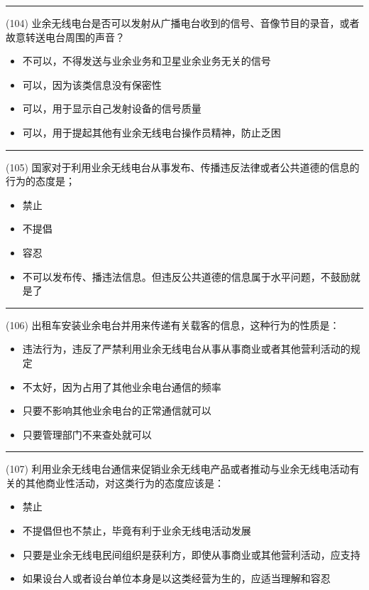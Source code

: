 \documentclass[twocolumn]{ctexart}  %
\begin{document}
\noindent\rule{0.5\textwidth}{1pt}
\heiti (104) 业余无线电台是否可以发射从广播电台收到的信号、音像节目的录音，或者故意转送电台周围的声音？ \songti {\color{gray} [LK0068] }
\begin{itemize}
	\item  不可以，不得发送与业余业务和卫星业余业务无关的信号
	\item  可以，因为该类信息没有保密性
	\item  可以，用于显示自己发射设备的信号质量
	\item  可以，用于提起其他有业余无线电台操作员精神，防止乏困
\end{itemize}


\noindent\rule{0.5\textwidth}{1pt}
\heiti (105) 国家对于利用业余无线电台从事发布、传播违反法律或者公共道德的信息的行为的态度是； \songti {\color{gray} [LK0069] }
\begin{itemize}
	\item  禁止
	\item  不提倡
	\item  容忍
	\item  不可以发布传、播违法信息。但违反公共道德的信息属于水平问题，不鼓励就是了
\end{itemize}


\noindent\rule{0.5\textwidth}{1pt}
\heiti (106) 出租车安装业余电台并用来传递有关载客的信息，这种行为的性质是： \songti {\color{gray} [LK0070] }
\begin{itemize}
	\item  违法行为，违反了严禁利用业余无线电台从事从事商业或者其他营利活动的规定
	\item  不太好，因为占用了其他业余电台通信的频率
	\item  只要不影响其他业余电台的正常通信就可以
	\item  只要管理部门不来查处就可以
\end{itemize}


\noindent\rule{0.5\textwidth}{1pt}
\heiti (107) 利用业余无线电台通信来促销业余无线电产品或者推动与业余无线电活动有关的其他商业性活动，对这类行为的态度应该是： \songti {\color{gray} [LK0071] }
\begin{itemize}
	\item  禁止
	\item  不提倡但也不禁止，毕竟有利于业余无线电活动发展
	\item  只要是业余无线电民间组织是获利方，即使从事商业或其他营利活动，应支持
	\item  如果设台人或者设台单位本身是以这类经营为生的，应适当理解和容忍
\end{itemize}
\end{document}
